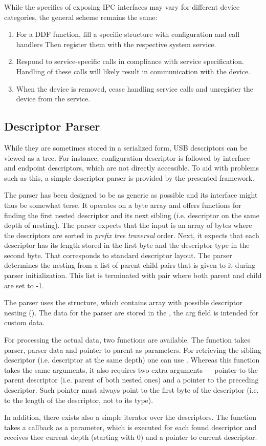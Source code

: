 While the specifics of exposing IPC interfaces may vary for different device
categories, the general scheme remains the same:
~
\begin{enumerate}
	\item For a DDF function, fill a specific structure with configuration and
		call handlers Then register them with the respective system service.
	\item Respond to service-specific calls in compliance with service
		specification. Handling of these calls will likely result in
		communication with the device.
	\item When the device is removed, cease handling service calls and
		unregister the device from the service.
\end{enumerate}


\subsection{Descriptor Parser}

While they are sometimes stored in a serialized form, USB descriptors can be
viewed as a tree. For instance, configuration descriptor is followed by
interface and endpoint descriptors, which are not directly accessible. To aid
with problems such as this, a simple descriptor parser is provided by the
presented framework.

The parser has been designed to be as generic as possible and its interface
might thus be somewhat terse. It operates on a byte array and offers functions
for finding the first nested descriptor and its next sibling (i.e. descriptor on
the same depth of nesting). The parser expects that the input is an array of
bytes where the descriptors are sorted in \textit{prefix tree traversal} order.
Next, it expects that each descriptor has its length stored in the first byte
and the descriptor type in the second byte. That corresponds to standard
descriptor layout. The parser determines the nesting from a list of parent-child
pairs that is given to it during parser initialization. This list is terminated
with pair where both parent and child are set to -1.

The parser uses the  structure, which contains array
with possible descriptor nesting (). The
data for the parser are stored in the , the arg
field is intended for custom data.

For processing the actual data, two functions are available. The
 function takes parser, parser data and
pointer to parent as parameters. For retrieving the sibling descriptor (i.e.
descriptor at the same depth) one can use .
Whereas this function takes the same arguments, it also requires two extra
arguments — pointer to the parent descriptor (i.e. parent of both nested ones)
and a pointer to the preceding descriptor. Such pointer must always point to
the first byte of the descriptor (i.e. to the length of the descriptor, not to
its type).

In addition, there exists also a simple iterator over the descriptors. The
function  takes a callback as a parameter, which is
executed for each found descriptor and receives thee current depth (starting
with 0) and a pointer to current descriptor.


